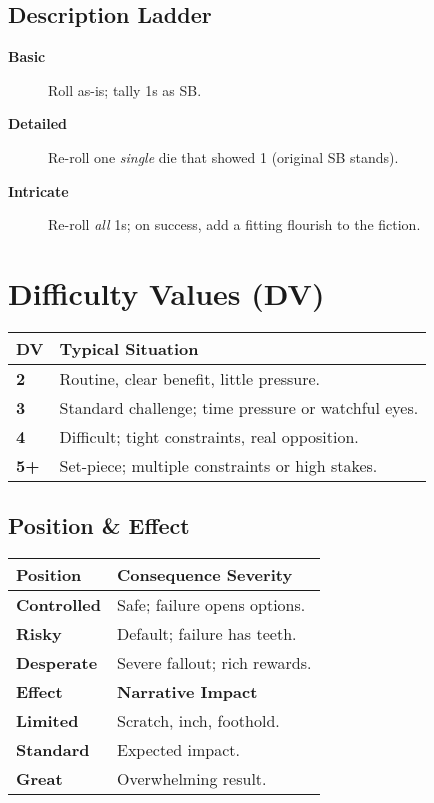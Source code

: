 \begin{multicols}{2}
\subsection*{Description Ladder}
\begin{description}
  \item[\textbf{Basic}] Roll as-is; tally 1s as SB.
  \item[\textbf{Detailed}] Re-roll one \emph{single} die that showed 1 (original SB stands).
  \item[\textbf{Intricate}] Re-roll \emph{all} 1s; on success, add a fitting flourish to the fiction.
\end{description}

\section{Difficulty Values (DV)}
\begin{center}
\begin{tabular}{lp{7.5cm}}
\toprule
\textbf{DV} & \textbf{Typical Situation} \\
\midrule
\textbf{2} & Routine, clear benefit, little pressure. \\
\textbf{3} & Standard challenge; time pressure or watchful eyes. \\
\textbf{4} & Difficult; tight constraints, real opposition. \\
\textbf{5+} & Set-piece; multiple constraints or high stakes. \\
\bottomrule
\end{tabular}
\end{center}

\subsection*{Position \& Effect}
\begin{center}
\begin{tabular}{lp{6.6cm}}
\toprule
\textbf{Position} & \textbf{Consequence Severity} \\
\midrule
\textbf{Controlled} & Safe; failure opens options. \\
\textbf{Risky} & Default; failure has teeth. \\
\textbf{Desperate} & Severe fallout; rich rewards. \\
\midrule
\textbf{Effect} & \textbf{Narrative Impact} \\
\midrule
\textbf{Limited} & Scratch, inch, foothold. \\
\textbf{Standard} & Expected impact. \\
\textbf{Great} & Overwhelming result. \\
\bottomrule
\end{tabular}
\end{center}


\end{multicols}
